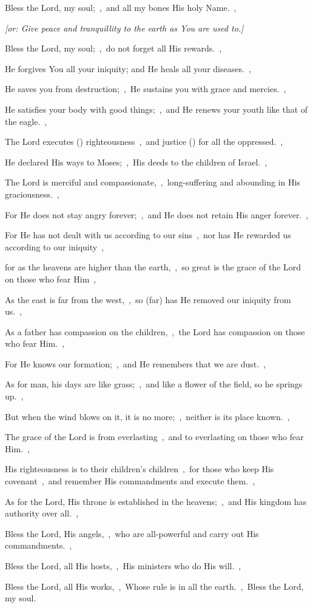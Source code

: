 \documentclass[12pt,twoside,a5paper]{article}
\begin{document}
\begin{normalparskip}
  Bless the Lord, my soul;~\sep\ and all my bones His holy Name.~\sep


  \emph{[or: Give peace and tranquillity to the earth as You are used to.]}

  Bless the Lord, my soul;~\sep\ do not forget all His rewards.~\sep

  He forgives You all your iniquity; and He heals all your diseases.~\sep

  He saves you from destruction;~\sep\ He sustains you with grace and mercies.~\sep

  He satisfies your body with good things;~\sep\ and He renews your youth like that of the eagle.~\sep

  The Lord executes () righteousness~\sep\ and justice () for all the oppressed.~\sep

  He declared His ways to Moses;~\sep\ His deeds to the children of Israel.~\sep

  The Lord is merciful and compassionate,~\sep\ long-suffering and abounding in His graciousness.~\sep

  For He does not stay angry forever;~\sep\ and He does not retain His anger forever.~\sep

  For He has not dealt with us according to our sins~\sep\ nor has He rewarded us according to our iniquity~\sep

  for as the heavens are higher than the earth,~\sep\ so great is the grace of the Lord on those who fear Him~\sep

  As the east is far from the west,~\sep\ so (far) has He removed our iniquity from us.~\sep

  As a father has compassion on the children,~\sep\ the Lord has compassion on those who fear Him.~\sep

  For He knows our formation;~\sep\ and He remembers that we are dust.~\sep

  As for man, his days are like grass;~\sep\ and like a flower of the field, so he springs up.~\sep

  But when the wind blows on it, it is no more;~\sep\ neither is its place known.~\sep

  The grace of the Lord is from everlasting~\sep\ and to everlasting on those who fear Him.~\sep

  His righteousness is to their children's children~\sep\ for those who keep His covenant~\sep\ and remember His commandments and execute them.~\sep

  As for the Lord, His throne is established in the heavens;~\sep\ and His kingdom has authority over all.~\sep

  Bless the Lord, His angels,~\sep\ who are all-powerful and carry out His commandments.~\sep

  Bless the Lord, all His hosts,~\sep\ His ministers who do His will.~\sep

  Bless the Lord, all His works,~\sep\ Whose rule is in all the earth.~\sep\ Bless the Lord, my soul.
\end{normalparskip}
\end{document}
